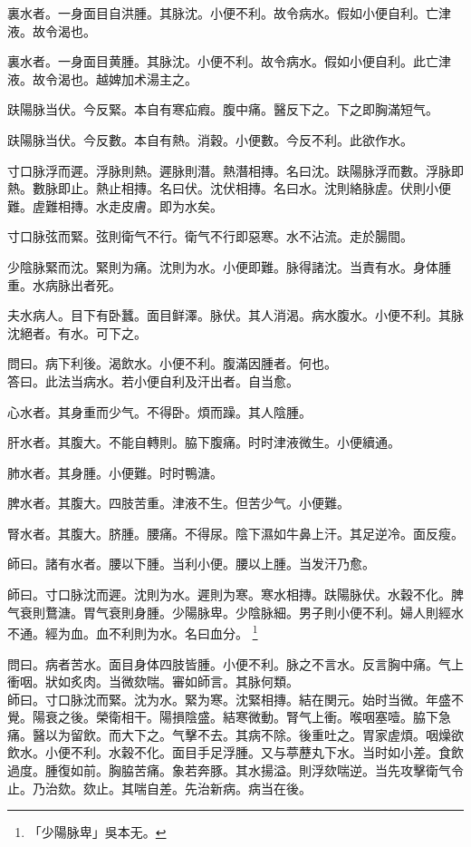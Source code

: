 裏水者。一身面目自洪腫。其脉沈。小便不利。故令病水。假如小便自利。亡津液。故令渴也。{\wuben}

裏水者。一身面目黄腫。其脉沈。小便不利。故令病水。假如小便自利。此亡津液。故令渴也。越婢加术湯主之。{\dengben}

趺陽脉当伏。今反緊。本自有寒疝瘕。腹中痛。醫反下之。下之即胸滿短气。

趺陽脉当伏。今反數。本自有熱。消穀。小便數。今反不利。此欲作水。

寸口脉浮而遲。浮脉則熱。遲脉則潛。熱潛相摶。名曰沈。趺陽脉浮而數。浮脉即熱。數脉即止。熱止相摶。名曰伏。沈伏相摶。名曰水。沈則絡脉虗。伏則小便難。虗難相摶。水走皮膚。即为水矣。

寸口脉弦而緊。弦則衛气不行。{\khaaitp 衛气不行}即惡寒。水不沾流。走於腸間。

少陰脉緊而沈。緊則为痛。沈則为水。小便即難。脉得諸沈。当責有水。身体腫重。水病脉出者死。

夫水病人。目下有卧蠶。面目鲜澤。脉伏。其人消渴。病水腹水。小便不利。其脉沈絕者。有水。可下之。

問曰。病下利後。渴飲水。小便不利。腹滿因腫者。何也。\\
答曰。此法当病水。若小便自利及汗出者。自当愈。

心水者。其身重而少气。不得卧。煩而躁。其人陰腫。

肝水者。其腹大。不能自轉則。脇下腹痛。时时津液微生。小便續通。

肺水者。其身腫。小便難。时时鴨溏。

脾水者。其腹大。四肢苦重。津液不生。但苦少气。小便難。

腎水者。其腹大。脐腫。腰痛。不得尿。陰下濕如牛鼻上汗。其足逆冷。面反瘦。

師曰。諸有水者。腰以下腫。当利小便。腰以上腫。当发汗乃愈。

師曰。寸口脉沈而遲。沈則为水。遲則为寒。寒水相摶。趺陽脉伏。水穀不化。脾气衰則鶩溏。胃气衰則身腫。{\khaaitp 少陽脉卑。}少陰脉細。男子則小便不利。婦人則經水不通。經为血。血不利則为水。名曰血分。
	\footnote{
		「少陽脉卑」吳本无。
	}

問曰。病者苦水。面目身体四肢皆腫。小便不利。脉之不言水。反言胸中痛。气上衝咽。狀如炙肉。当微欬喘。審如師言。其脉何類。\\
師曰。寸口脉沈而緊。沈为水。緊为寒。沈緊相摶。結在関元。始时当微。年盛不覺。陽衰之後。榮衛相干。陽損陰盛。結寒微動。腎气上衝。喉咽塞噎。脇下急痛。醫以为留飲。而大下之。气擊不去。其病不除。後重吐之。胃家虗煩。咽燥欲飲水。小便不利。水穀不化。面目手足浮腫。又与葶藶丸下水。当时如小差。食飲過度。腫復如前。胸脇苦痛。象若奔豚。其水揚溢。則浮欬喘逆。当先攻擊衛气令止。乃治欬。欬止。其喘自差。先治新病。病当在後。

